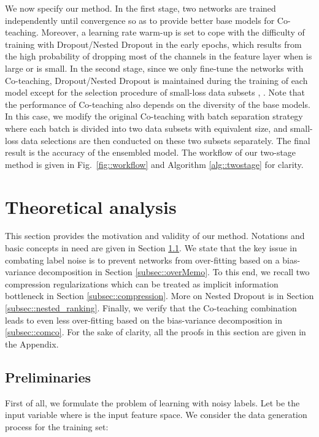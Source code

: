 \documentclass[journal]{IEEEtran}
\begin{document}
We now specify our method.
In the first stage, two networks are trained independently until convergence so as to provide better base models for Co-teaching.
Moreover, a learning rate warm-up is set to cope with the difficulty of training with Dropout/Nested Dropout in the early epochs, which results from the high probability of dropping most of the channels in the feature layer when  is large or  is small.
In the second stage, since we only fine-tune the networks with Co-teaching, Dropout/Nested Dropout is maintained during the training of each model except for the selection procedure of small-loss data subsets , . 
Note that the performance of Co-teaching also depends on the diversity of the base models.
In this case, we modify the original Co-teaching \cite{han2018co} with batch separation strategy where each batch is divided into two data subsets with equivalent size, and small-loss data selections are then conducted on these two subsets separately.
The final result is the accuracy of the ensembled model. 
The workflow of our two-stage method is given in
Fig.~\ref{fig::workflow} and Algorithm \ref{alg::twostage} for clarity.



\section{Theoretical analysis} \label{sec::theory}
This section provides the motivation and validity of our method.
Notations and basic concepts in need are given in Section \ref{subsec::preliminaries}.
We state that the key issue in combating label noise is to prevent networks from over-fitting based on a bias-variance decomposition in Section \ref{subsec::overMemo}.
To this end, we recall two compression regularizations which can be treated as implicit information bottleneck in Section \ref{subsec::compression}.
More on Nested Dropout is in Section \ref{subsec::nested_ranking}.
Finally, we verify that the Co-teaching combination leads to even less over-fitting based on the bias-variance decomposition in \ref{subsec::comco}.
For the sake of clarity, all the proofs in this section are given in the Appendix.

\subsection{Preliminaries} \label{subsec::preliminaries}
First of all, we formulate the problem of learning with noisy labels.
Let  be the input variable where  is the input feature space.
We consider the data generation process for the training set:
\end{document}
